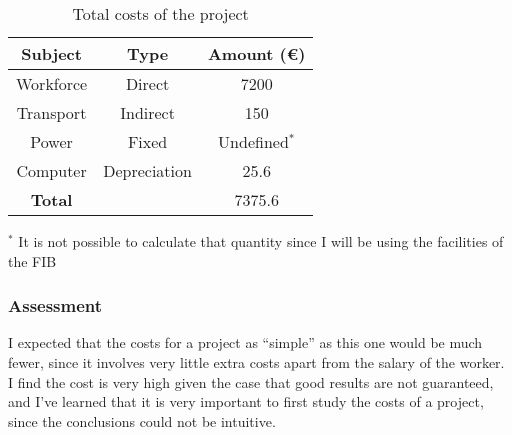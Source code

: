 \documentclass[a4paper]{article}
\begin{document}
            \begin{table}
                \centering
                \begin{tabular}{|c|c|c|}
                    \hline
                    \textbf{Subject} & \textbf{Type} & \textbf{Amount (€)} \\
                    \hline
                    \hline
                    Workforce & Direct & 7200 \\
                    \hline
                    Transport & Indirect & 150 \\
                    \hline
                    Power & Fixed & Undefined$^*$ \\
                    \hline
                    Computer & Depreciation & 25.6 \\
                    \hline
                    \textbf{Total} & & 7375.6 \\
                    \hline
                \end{tabular}
                \caption{Total costs of the project}
                \label{Tab:2}
                $^*$ It is not possible to calculate that quantity since I will be using the facilities of the FIB
            \end{table}

            \subsubsection{Assessment}


            I expected that the costs for a project as ``simple'' as this one would be much fewer, since it involves very little extra costs apart from the salary of the worker. I find the cost is very high given the case that good results are not guaranteed, and I've learned that it is very important to first study the costs of a project, since the conclusions could not be intuitive.

\end{document}
